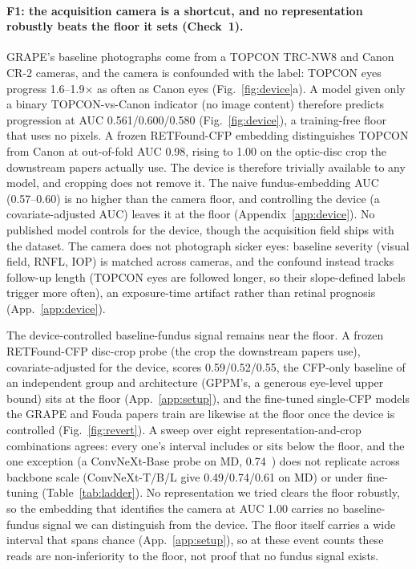 \paragraph{F1: the acquisition camera is a shortcut, and no representation robustly beats the floor it sets (Check~1).} GRAPE's baseline photographs come from a TOPCON
TRC-NW8 and Canon CR-2 cameras, and the camera is confounded with the label: TOPCON eyes progress \num{1.6}--\num{1.9}$\times$
as often as Canon eyes (Fig.~\ref{fig:device}a). A model given only a
binary TOPCON-vs-Canon indicator (no image content) therefore predicts progression at AUC
\num{0.561}/\num{0.600}/\num{0.580} (Fig.~\ref{fig:device}), a training-free floor that uses no pixels. A frozen
RETFound-CFP embedding distinguishes TOPCON from Canon at out-of-fold AUC \num{0.98}, rising to \num{1.00} on the
optic-disc crop the downstream papers actually use. The device is therefore trivially available to any model, and cropping
does not remove it. The naive fundus-embedding
AUC (\num{0.57}--\num{0.60}) is no higher than the camera floor, and controlling the device (a covariate-adjusted AUC)
leaves it at the floor (Appendix~\ref{app:device}). No published model controls for the device, though the acquisition
field ships with the dataset. The camera does not photograph sicker eyes: baseline severity (visual field, RNFL, IOP) is
matched across cameras, and the confound instead tracks follow-up length (TOPCON eyes are followed longer, so their
slope-defined labels trigger more often), an exposure-time artifact rather than retinal prognosis (App.~\ref{app:device}).

The device-controlled baseline-fundus signal remains near the floor. A frozen RETFound-CFP disc-crop probe (the crop the
downstream papers use), covariate-adjusted for the device, scores \num{0.59}/\num{0.52}/\num{0.55}, the CFP-only baseline of an independent group and architecture
(GPPM's, a generous eye-level upper bound) sits at the floor (App.~\ref{app:setup}), and the
fine-tuned single-CFP models the GRAPE and Fouda papers train are likewise at the floor once the device is controlled
(Fig.~\ref{fig:revert}). A sweep over eight representation-and-crop combinations agrees: every one's interval includes or
sits below the floor, and the one exception (a ConvNeXt-Base probe on MD, \num{0.74}~) does not replicate
across backbone scale (ConvNeXt-T/B/L give \num{0.49}/\num{0.74}/\num{0.61} on MD) or under fine-tuning
(Table~\ref{tab:ladder}).
No representation we tried clears the floor robustly, so the embedding that identifies the camera at AUC \num{1.00}
carries no baseline-fundus signal we can distinguish from the device. The floor itself carries a wide interval that spans
chance (App.~\ref{app:setup}), so at these event counts these reads are non-inferiority to the floor, not proof that no
fundus signal exists.

